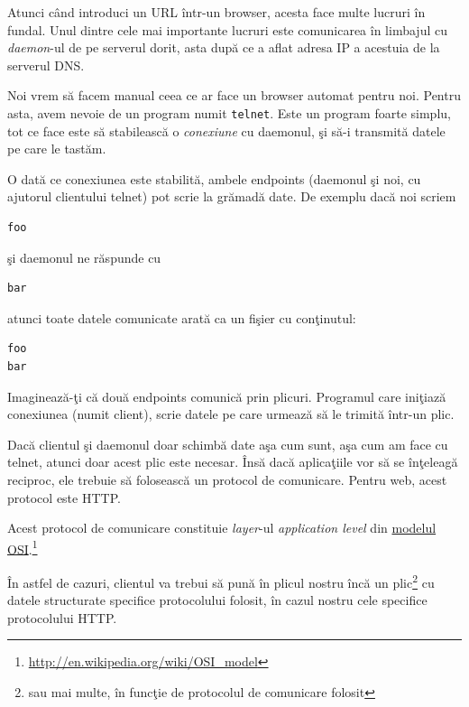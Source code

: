 \vspace{1em}\dotfill\vspace{1em}

Atunci când introduci un URL într-un browser, acesta face multe lucruri în fundal.
Unul dintre cele mai importante lucruri este comunicarea în limbajul
 cu \textit{daemon}-ul de pe serverul dorit,
asta după ce a aflat adresa IP a acestuia de la serverul DNS.

Noi vrem să facem manual ceea ce ar face un browser automat pentru noi. Pentru asta,
avem nevoie de un program numit \texttt{telnet}. Este un program foarte simplu, tot ce
face este să stabilească o \textsl{conexiune} cu daemonul, şi să-i transmită datele pe care
le tastăm.

O dată ce conexiunea este stabilită, ambele endpoints (daemonul şi noi, cu ajutorul
clientului telnet) pot scrie la grămadă date. De exemplu dacă noi scriem
\begin{verbatim}
foo
\end{verbatim}
şi daemonul ne răspunde cu
\begin{verbatim}
bar
\end{verbatim}
atunci toate datele comunicate arată ca un fişier cu conţinutul:
\begin{verbatim}
foo
bar
\end{verbatim}

Imaginează-ţi că două endpoints comunică prin plicuri.
Programul care iniţiază conexiunea (numit client), scrie datele pe
care urmează să le trimită într-un plic.

Dacă clientul şi daemonul doar schimbă date {\glqq}aşa cum sunt{\grqq},
aşa cum am face cu telnet, atunci doar acest plic este necesar.
Însă dacă aplicaţiile vor să se înţeleagă reciproc,
ele trebuie să folosească un protocol de comunicare.
Pentru web, acest protocol este HTTP.

Acest protocol de comunicare constituie \textit{layer}-ul \textsl{application level}
din \href{http://en.wikipedia.org/wiki/OSI_model}{modelul OSI}.\footnote{\url{http://en.wikipedia.org/wiki/OSI_model}}

În astfel de cazuri, clientul va trebui să pună în plicul nostru încă
un plic\footnote{sau mai multe, în funcţie de protocolul de comunicare folosit}
cu datele structurate specifice protocolului folosit,
în cazul nostru cele specifice protocolului HTTP.

